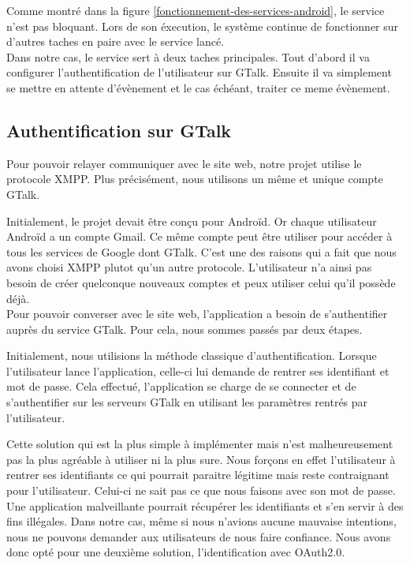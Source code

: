 Comme montré dans la figure \ref{fonctionnement-des-services-android}, le service n'est pas  bloquant. 
Lors de son éxecution, le système continue de fonctionner sur d'autres taches en paire avec le service lancé.
\\

Dans notre cas, le service sert à deux taches principales. Tout d'abord il va configurer l'authentification
de l'utilisateur sur GTalk. Ensuite il va simplement se mettre en attente d'évènement et le cas échéant, 
traiter ce meme évènement.
\\



\subsection{Authentification sur GTalk}

Pour pouvoir relayer communiquer avec le site web, notre projet utilise le protocole XMPP. Plus 
précisément, nous utilisons un même et unique compte GTalk. 

Initialement, le projet devait être conçu pour Androïd. Or chaque utilisateur Androïd a un compte 
Gmail. Ce même compte peut être utiliser pour accéder à tous les services de Google dont GTalk.
C'est une des raisons qui a fait que nous avons choisi XMPP plutot qu'un autre protocole. L'utilisateur
n'a ainsi pas besoin de créer quelconque nouveaux comptes et peux utiliser celui qu'il possède déjà.
\\


Pour pouvoir converser avec le site web, l'application a besoin de s'authentifier auprès du service
GTalk. Pour cela, nous sommes passés par deux étapes. 

Initialement, nous utilisions la méthode classique d'authentification. Lorsque l'utilisateur lance 
l'application, celle-ci lui demande de rentrer ses identifiant et mot de passe. Cela effectué, 
l'application se charge de se connecter et de s'authentifier sur les serveurs GTalk en utilisant les
paramètres rentrés par l'utilisateur.

Cette solution qui est la plus simple à implémenter mais n'est malheureusement pas la plus agréable
à utiliser ni la plus sure. Nous forçons en effet l'utilisateur à rentrer ses identifiants ce qui 
pourrait paraitre légitime mais reste contraignant pour l'utilisateur. Celui-ci ne sait pas ce que 
nous faisons avec son mot de passe. Une application malveillante pourrait récupérer les identifiants
et s'en servir à des fins illégales. Dans notre cas, même si nous n'avions aucune mauvaise intentions,
nous ne pouvons demander aux utilisateurs de nous faire confiance. Nous avons donc opté pour une 
deuxième solution, l'identification avec OAuth2.0.

